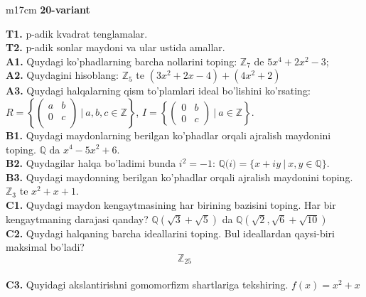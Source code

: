 \documentclass{article}
\begin{document}
\begin{tabular}{m{17cm}}
\textbf{20-variant}
\newline

\textbf{T1.} p-adik kvadrat tenglamalar. \\
\textbf{T2.} p-adik sonlar maydoni va ular ustida amallar. \\
\textbf{A1.} Quydagi ko'phadlarning barcha nollarini toping:
\(\mathbb{Z}_{7}\) de \(5x^{4} + 2x^{2} - 3\); \\
\textbf{A2.} Quydagini hisoblang:
\(\mathbb{Z}_{5}\) te \(\left( 3x^{2} + 2x - 4 \right) + \left( 4x^{2} + 2 \right)\) \\
\textbf{A3.} Quydagi halqalarning qism to'plamlari ideal bo'lishini ko'rsating: \(R = \left\{ \begin{pmatrix}
a & b \\
0 & c \\
 & 
\end{pmatrix}\ |\ a,b,c \in \mathbb{Z} \right\}\), \(I = \left\{ \begin{pmatrix}
0 & b \\
0 & c
\end{pmatrix}\ |\ a \in \mathbb{Z} \right\}\). \\
\textbf{B1.} Quydagi maydonlarning berilgan ko'phadlar orqali ajralish maydonini toping.
\(\mathbb{Q}\) da \(x^{4} - 5x^{2} + 6\). \\
\textbf{B2.} Quydagilar halqa bo'ladimi bunda \(i^{2} = - 1\):
\(\mathbb{Q(}i) = \{ x + iy\ |\ x,y \in \mathbb{Q\}}\). \\
\textbf{B3.} Quydagi maydonning berilgan ko'phadlar orqali ajralish maydonini toping.
\(\mathbb{Z}_{3}\) te \(x^{2} + x + 1\). \\
\textbf{C1.} Quydagi maydon kengaytmasining har birining bazisini toping. Har bir kengaytmaning darajasi qanday?
\(\mathbb{Q}\left( \sqrt{3} + \sqrt{5} \right)\) da \(\mathbb{Q}\left( \sqrt{2},\sqrt{6} + \sqrt{10} \right)\) \\
\textbf{C2.} Quydagi halqaning barcha ideallarini toping. Bul ideallardan qaysi-biri maksimal bo'ladi?
\[\mathbb{Z}_{25}\] \\
\textbf{C3.} Quyidagi akslantirishni gomomorfizm shartlariga tekshiring. \(f(x) = x^{2} + x\) \\

\end{tabular}
\vspace{1cm}
\end{document}
